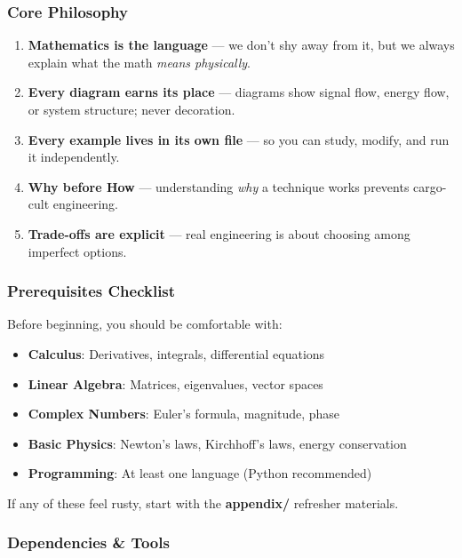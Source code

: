 \documentclass[11pt,a4paper]{book}
\begin{document}
\medskip\noindent\hrulefill\medskip

\subsubsection{Core Philosophy}

\begin{enumerate}
\item \textbf{Mathematics is the language} — we don't shy away from it, but we always explain what the math \textit{means physically}.
\item \textbf{Every diagram earns its place} — diagrams show signal flow, energy flow, or system structure; never decoration.
\item \textbf{Every example lives in its own file} — so you can study, modify, and run it independently.
\item \textbf{Why before How} — understanding \textit{why} a technique works prevents cargo-cult engineering.
\item \textbf{Trade-offs are explicit} — real engineering is about choosing among imperfect options.
\end{enumerate}

\medskip\noindent\hrulefill\medskip

\subsubsection{Prerequisites Checklist}

Before beginning, you should be comfortable with:

\begin{itemize}
\item [ ] \textbf{Calculus}: Derivatives, integrals, differential equations
\item [ ] \textbf{Linear Algebra}: Matrices, eigenvalues, vector spaces
\item [ ] \textbf{Complex Numbers}: Euler's formula, magnitude, phase
\item [ ] \textbf{Basic Physics}: Newton's laws, Kirchhoff's laws, energy conservation
\item [ ] \textbf{Programming}: At least one language (Python recommended)
\end{itemize}

If any of these feel rusty, start with the \textbf{appendix/} refresher materials.

\medskip\noindent\hrulefill\medskip

\subsubsection{Dependencies & Tools}
\end{document}
